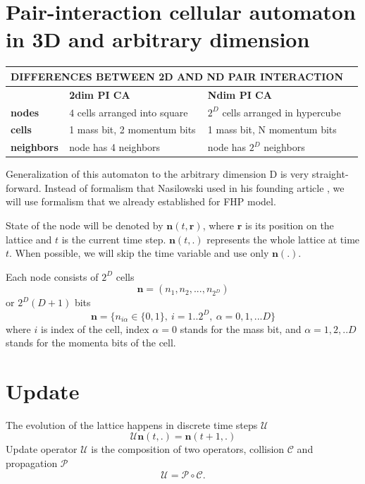 \section{Pair-interaction cellular automaton in 3D and arbitrary dimension}
\begin{center}
    \begin{tabular}{| l | l | l | l |}
    \hline
    \multicolumn{3}{|c|}{DIFFERENCES BETWEEN \textbf{2}D AND \textbf{N}D PAIR INTERACTION}\\ \hline
     & \textbf{2dim PI CA} & \textbf{Ndim PI CA} \\ \hline
    \textbf{nodes} & $4$ cells arranged into square & $2^D$ cells arranged in hypercube \\ \hline
    \textbf{cells} & 1 mass bit, 2 momentum bits  & 1 mass bit, N momentum bits \\ \hline
    \textbf{neighbors} & node has 4 neighbors & node has $2^D$ neighbors  \\ \hline
    \end{tabular}
\end{center}

Generalization of this automaton to the arbitrary dimension D is very straight-forward. Instead of formalism that Nasilowski used in his founding article \cite{nasilowski}, we will use formalism that we already established for FHP model.

State of the node will be denoted by $\bm{n}(t,\bm{r})$, where $\bm{r}$ is its position on the lattice and $t$ is the current time step. $\bm{n}(t,.)$ represents the whole lattice at time $t$. When possible, we will skip the time variable and use only $\bm{n}(.)$.

Each node consists of $2^D$ cells
\begin{equation}
\bm{n} = (n_1, n_2, ... , n_{2^D})
\end{equation}
or $2^D(D+1)$ bits
\begin{equation}
\bm{n} = \big\{ n_{i\alpha} \in \big\{0,1\big\},~i = 1..2^D, ~\alpha = 0,1,...D\big\}
\end{equation}
where $i$ is index of the cell, index $\alpha = 0$ stands for the mass bit, and $\alpha = 1,2,..D$ stands for the momenta bits of the cell.

\section{Update}
The evolution of the lattice happens in discrete time steps $\mathcal{U}$
\begin{equation}
\mathcal{U} \bm{n}(t,.) = \bm{n}(t+1,.)
\end{equation} 
Update operator $\mathcal{U}$ is the composition of two operators, collision $\mathcal{C}$ and propagation $\mathcal{P}$
\begin{equation}
\mathcal{U} = \mathcal{P} \circ \mathcal{C}.
\end{equation} 

